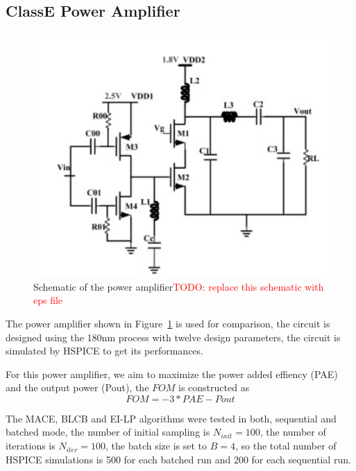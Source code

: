 \subsection{ClassE Power Amplifier}


\begin{figure}[htbp]
    \begin{center}
        \centerline{\includegraphics[width=\columnwidth]{./img/classE.png}}
        \caption{Schematic of the power amplifier\textcolor{red}{TODO: replace this schematic with eps file} }
        \label{fig:schPA}
    \end{center}
\end{figure}

The power amplifier shown in Figure~\ref{fig:schPA} is used for comparison, the
circuit is designed using the 180nm process with twelve design parameters, the
circuit is simulated by HSPICE to get its performances.

For this power amplifier, we aim to maximize the power added effiency (PAE) and the output power (Pout), the $FOM$ is constructed as
$$
\mathit{FOM} = -3 * \mathit{PAE} - \mathit{Pout}
$$

The MACE, BLCB and EI-LP algorithms were tested in both, sequential and batched
mode, the number of initial sampling is $N_{init} = 100$, the number of
iterations is $N_{iter} = 100$, the batch size is set to $B = 4$, so the total
number of HSPICE simulations is 500 for each batched run and 200 for each
sequential run.


